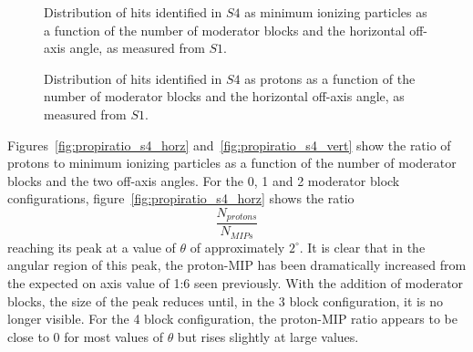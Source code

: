    	\begin{figure}[!ht]
   		\begin{minipage}[t]{0.48\textwidth}
   			\begin{adjustbox}{max totalsize={\textwidth}{.35\textheight},center}
		   		
	   		\end{adjustbox}
	   		\caption{Distribution of hits identified in $S4$ as minimum ionizing particles as a function of the number of moderator blocks and the horizontal off-axis angle, as measured from $S1$.}
	   		\label{fig:thetas4mip}
   		\end{minipage}
   		\hspace{0.3cm}
   		\begin{minipage}[t]{0.48\textwidth}
	   		\begin{adjustbox}{max totalsize={\textwidth}{.35\textheight},center}
	   			
	   		\end{adjustbox}
   			\caption{Distribution of hits identified in $S4$ as protons as a function of the number of moderator blocks and the horizontal off-axis angle, as measured from $S1$.}
   			\label{fig:thetas4pro}
   		\end{minipage} 
	\end{figure}	
        
     Figures~\ref{fig:propiratio_s4_horz} and~\ref{fig:propiratio_s4_vert} show the ratio of protons to minimum ionizing particles as a function of the number of moderator blocks and the two off-axis angles.
     For the 0, 1 and 2 moderator block configurations, figure~\ref{fig:propiratio_s4_horz} shows the ratio
     \begin{equation*}
     \frac{N_{protons}}{N_{MIPs}}
     \end{equation*}	
     reaching its peak at a value of $\theta$ of approximately $2^{\circ}$.
     It is clear that in the angular region of this peak, the proton-MIP has been dramatically increased from the expected on axis value of 1:6 seen previously.
     With the addition of moderator blocks, the size of the peak reduces until, in the 3 block configuration, it is no longer visible. 
     For the 4 block configuration, the proton-MIP ratio appears to be close to 0 for most values of $\theta$ but rises slightly at large values.
     
